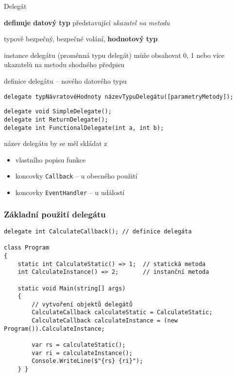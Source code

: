 

\begin{frame}[fragile]
\begin{bitemize}{Delegát}
\item \textbf{definuje datový typ} představující \textit{ukazatel na metodu}
\item typově bezpečný, bezpečné volání, \textbf{hodnotový typ}
\item instance delegátu (proměnná typu delegát) může obsahovat 0, 1 nebo více ukazatelů na metodu shodného předpisu
\end{bitemize}
\vfill
\begin{noteblock}{definice delegátu -- nového datového typu}
\begin{lstlisting}
delegate typNávratovéHodnoty názevTypuDelegátu([parametryMetody]);
\end{lstlisting}
\end{noteblock}
\vfill
\begin{yesblock}
\begin{lstlisting}
delegate void SimpleDelegate();
delegate int ReturnDelegate();
delegate int FunctionalDelegate(int a, int b);
\end{lstlisting}
\end{yesblock}
\vfill
\begin{bitemize}{}
\item název delegátu by se měl skládat z 
\begin{itemize}
\item vlastního popisu funkce
\item koncovky \lstinline|Callback| -- u obecného použití
\item koncovky \lstinline|EventHandler| -- u událostí
\end{itemize}

\end{bitemize}
\end{frame}





\begin{frame}[fragile]
\frametitle{Základní použití delegátu}
\begin{yesblock}
\begin{lstlisting}
delegate int CalculateCallback(); // definice delegáta

class Program
{
    static int CalculateStatic() => 1;  // statická metoda
    int CalculateInstance() => 2;       // instanční metoda

    static void Main(string[] args)
    {
        // vytvoření objektů delegátů
        CalculateCallback calculateStatic = CalculateStatic;
        CalculateCallback calculateInstance = (new Program()).CalculateInstance;

        var rs = calculateStatic();
        var ri = calculateInstance();
        Console.WriteLine($"{rs} {ri}");
    } }
\end{lstlisting}
\end{yesblock}
\end{frame}





